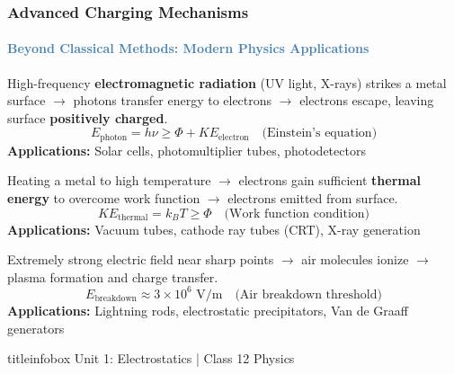 \begin{frame}
\frametitle{\textsf{\textbf{Advanced Charging Mechanisms}}}
\framesubtitle{\textcolor{steelblue}{Beyond Classical Methods: Modern Physics Applications}}

\vspace{-0.05cm}

\begin{examplebox}
\vspace{0.05cm}
High-frequency \textbf{electromagnetic radiation} (UV light, X-rays) strikes a metal surface $\rightarrow$ photons transfer energy to electrons $\rightarrow$ electrons escape, leaving surface \textbf{positively charged}.
\begin{equation*}
E_{\text{photon}} = h\nu \geq \Phi + KE_{\text{electron}} \quad \text{(Einstein's equation)}
\end{equation*}
\textbf{Applications:} Solar cells, photomultiplier tubes, photodetectors
\end{examplebox}

\vspace{0.25cm}

\begin{examplebox}
\vspace{0.05cm}
Heating a metal to high temperature $\rightarrow$ electrons gain sufficient \textbf{thermal energy} to overcome work function $\rightarrow$ electrons emitted from surface.
\begin{equation*}
KE_{\text{thermal}} = k_BT \geq \Phi \quad \text{(Work function condition)}
\end{equation*}
\textbf{Applications:} Vacuum tubes, cathode ray tubes (CRT), X-ray generation
\end{examplebox}

\vspace{0.25cm}

\begin{examplebox}
\vspace{0.05cm}
Extremely strong electric field near sharp points $\rightarrow$ air molecules ionize $\rightarrow$ plasma formation and charge transfer.
\begin{equation*}
E_{\text{breakdown}} \approx 3 \times 10^6 \text{ V/m} \quad \text{(Air breakdown threshold)}
\end{equation*}
\textbf{Applications:} Lightning rods, electrostatic precipitators, Van de Graaff generators
\end{examplebox}

\vfill

\begin{beamercolorbox}[wd=\textwidth,ht=0.5cm,dp=0.1cm,center]{titleinfobox}
    \small\color{coolgray} Unit 1: Electrostatics | Class 12 Physics
\end{beamercolorbox}
\end{frame}


